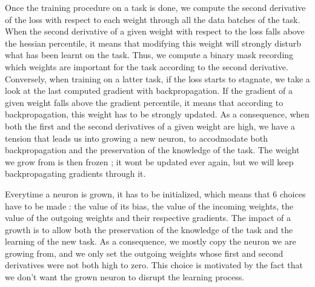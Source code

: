 \documentclass[11pt]{article}
\begin{document}
\vspace{2mm}
\noindent
Once the training procedure on a task is done, we compute the second derivative of the loss with respect to each weight through all the data batches of the task. When the second derivative of a given weight with respect to the loss falls above the hessian percentile, it means that modifying this weight will strongly disturb what has been learnt on the task. Thus, we compute a binary mask recording which weights are important for the task according to the second derivative. Conversely, when training on a latter task, if the loss starts to stagnate, we take a look at the last computed gradient with backpropagation. If the gradient of a given weight falls above the gradient percentile, it means that according to backpropagation, this weight has to be strongly updated. As a consequence, when both the first and the second derivatives of a given weight are high, we have a tension that leads us into growing a new neuron, to accodmodate both backpropagation and the preservation of the knowledge of the task. The weight we grow from is then frozen ; it wont be updated ever again, but we will keep backpropagating gradients through it.

\vspace{2mm}
\noindent
Everytime a neuron is grown, it has to be initialized, which means that 6 choices have to be made : the value of its bias, the value of the incoming weights, the value of the outgoing weights and their respective gradients. The impact of a growth is to allow both the preservation of the knowledge of the task and the learning of the new task. As a consequence, we mostly copy the neuron we are growing from, and we only set the outgoing weights whose first and second derivatives were not both high to zero. This choice is motivated by the fact that we don't want the grown neuron to disrupt the learning process.
\end{document}
